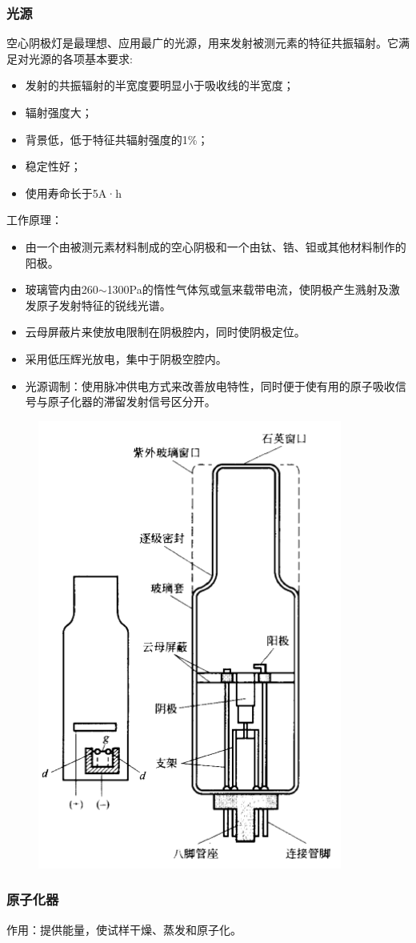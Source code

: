 \subsubsection{光源}
空心阴极灯是最理想、应用最广的光源，用来发射被测元素的特征共振辐射。它满足对光源的各项基本要求:
\begin{itemize}
	\item 发射的共振辐射的半宽度要明显小于吸收线的半宽度；
	\item 辐射强度大；
	\item 背景低，低于特征共辐射强度的1\%；
	\item 稳定性好；
	\item 使用寿命长于5A·h
\end{itemize}

工作原理：
\begin{itemize}
	\item 由一个由被测元素材料制成的空心阴极和一个由钛、锆、钽或其他材料制作的阳极。
	\item 玻璃管内由260$\sim$1300Pa的惰性气体氖或氩来载带电流，使阴极产生溅射及激发原子发射特征的锐线光谱。
	\item 云母屏蔽片来使放电限制在阴极腔内，同时使阴极定位。
	\item 采用低压辉光放电，集中于阴极空腔内。
	\item 光源调制：使用脉冲供电方式来改善放电特性，同时便于使有用的原子吸收信号与原子化器的滞留发射信号区分开。
\end{itemize}

\begin{figure}[!h]
	\centering
	\includegraphics[width=0.4\linewidth]{image/chp8_ICP_lamp}
	\caption{}
	\label{fig:chp8icplamp}
\end{figure}

\subsubsection{原子化器}
作用：提供能量，使试样干燥、蒸发和原子化。

